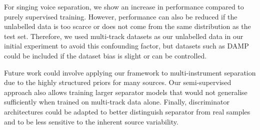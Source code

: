 \documentclass{article}
\begin{document}
For singing voice separation, we show an increase in performance compared to purely supervised training.
However, performance can also be reduced if the unlabelled data is too scarce or does not come from the same distribution as the test set.  
Therefore, we used multi-track datasets as our unlabelled data in our initial experiment to avoid this confounding factor, but datasets such as DAMP~\cite{Smith2013} could be included if the dataset bias is slight or can be controlled.

Future work could involve applying our framework to multi-instrument separation due to the highly structured priors for many sources.
Our semi-supervised approach also allows training larger separator models that would not generalise sufficiently when trained on multi-track data alone.
Finally, discriminator architectures could be adapted to better distinguish separator from real samples and to be less sensitive to the inherent source variability.



\end{document}
